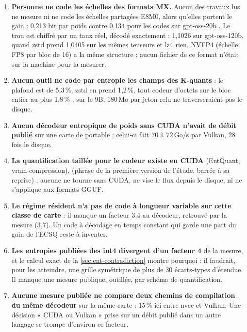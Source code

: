 \begin{enumerate}
\item \textbf{Personne ne code les échelles des formats MX.} Aucun des travaux lus ne mesure ni ne code les échelles partagées E8M0, alors qu'elles portent le gain : 0,213 bit par poids contre 0,134 pour les codes sur gpt-oss-20b \calc. Le trou est chiffré par un taux réel, décodé exactement : 1,1026 sur gpt-oss-120b, quand zstd prend 1,0405 sur les mêmes tenseurs et lz4 rien. NVFP4 (échelle FP8 par bloc de 16) a la même structure ; aucun fichier de ce format n'était sur la machine pour la mesurer.
\item \textbf{Aucun outil ne code par entropie les champs des K-quants} : le plafond est de 5,3\,\%, zstd en prend 1,2\,\%, tout codeur d'octets sur le bloc entier au plus 1,8\,\% ; sur le 9B, 180\,Mo par jeton relu ne traverseraient pas le disque.
\item \textbf{Aucun décodeur entropique de poids sans CUDA n'avait de débit publié} sur une carte de portable ; celui-ci fait 70 à 72\,Go/s par Vulkan, 28 fois le disque.
\item \textbf{La quantification taillée pour le codeur existe en CUDA} (EntQuant, vram-compression),  (phrase de la première version de l'étude, barrée à sa reprise) ; aucune ne tourne sans CUDA, ne vise le flux depuis le disque, ni ne s'applique aux formats GGUF.
\item \textbf{Le régime résident n'a pas de code à longueur variable sur cette classe de carte} : il manque un facteur 3,4 au décodeur, retrouvé par la mesure (3,7). Un code à décodage en temps constant qui garde une part du gain de l'ECSQ reste à inventer.
\item \textbf{Les entropies publiées des int4 divergent d'un facteur 4} de la mesure, et le calcul exact de la \cref{sec:ent-contradiction} montre pourquoi : il faudrait, pour les atteindre, une grille symétrique de plus de 30 écarts-types d'étendue. Il manque une mesure publique, outillée, par schéma de quantification.
\item \textbf{Aucune mesure publiée ne compare deux chemins de compilation du même décodeur} sur la même carte : 15\,\% ici entre nvcc et Vulkan. Une décision « CUDA ou Vulkan » prise sur un débit publié dans un autre langage se trompe d'environ ce facteur.
\end{enumerate}

